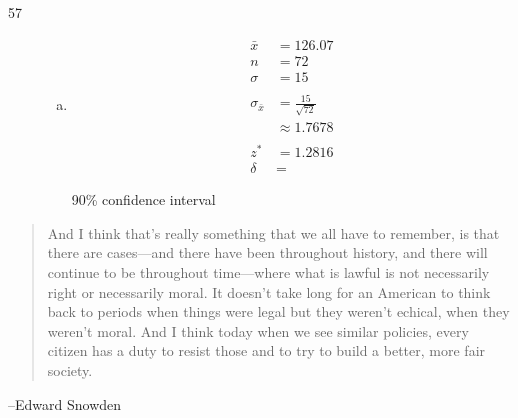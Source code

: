 \documentclass[letterpaper]{exam}
\begin{document}
\begin{description}
      \item[57]
        \begin{enumerate}[(a)]
          \item 
            \begin{align*}
              \bar{x} & = 126.07 \\
              n       & = 72 \\
              \sigma  & = 15 \\
              \\
              \sigma_{\bar{x}} & = \frac{15}{\sqrt{72}} \\
                               & \approx 1.7678 \\
                               \\
              z^* &= 1.2816 \\
              \delta &= 
            \end{align*}

            90\% confidence interval
        \end{enumerate}

  \end{description}

  \else
    \vspace{2 cm}
    \begin{quote}
      \begin{em}
        And I think that's really something that we all have to remember, is
        that there are cases---and there have been throughout history, and there
        will continue to be throughout time---where what is lawful is not
        necessarily right or necessarily moral. It doesn't take long for an
        American to think back to periods when things were legal but they
        weren't echical, when they weren't moral. And I think today when we see
        similar policies, every citizen has a duty to resist those and to try to
        build a better, more fair society.
      \end{em}
    \end{quote}
    \hspace{1 cm}--Edward Snowden
  \fi
\end{document}
